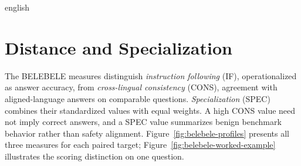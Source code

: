\begin{otherlanguage*}{english}
\GradedReferenceTable

\section{Distance and Specialization}
\label{sec:graded-distance-spec}
The BELEBELE measures distinguish \emph{instruction following} (IF), operationalized as answer accuracy, from \emph{cross-lingual consistency} (CONS), agreement with aligned-language answers on comparable questions. \emph{Specialization} (SPEC) combines their standardized values with equal weights. A high CONS value need not imply correct answers, and a SPEC value summarizes benign benchmark behavior rather than safety alignment. Figure~\ref{fig:belebele-profiles} presents all three measures for each paired target; Figure~\ref{fig:belebele-worked-example} illustrates the scoring distinction on one question.


\end{otherlanguage*}
